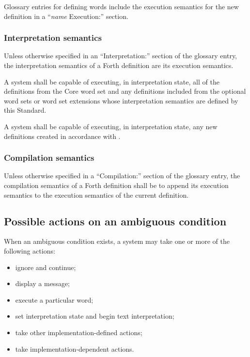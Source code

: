 Glossary entries for defining words include the execution semantics
for the new definition in a ``\emph{name} \textsf{Execution:}''
section.

\subsubsection{Interpretation semantics} %
\label{usage:interpret}

Unless otherwise specified in an ``\textsf{Interpretation:}''
section of the glossary entry, the interpretation semantics of a
Forth definition are its execution semantics.

A system shall be capable of executing, in interpretation state,
all of the definitions from the Core word set and any definitions
included from the optional word sets or word set extensions whose
interpretation semantics are defined by this Standard.

A system shall be capable of executing, in interpretation state,
any new definitions created in accordance with
.

\subsubsection{Compilation semantics} %
\label{usage:compile}

Unless otherwise specified in a ``\textsf{Compilation:}'' section
of the glossary entry, the compilation semantics of a Forth
definition shall be to append its execution semantics to the
execution semantics of the current definition.


\subsection{Possible actions on an ambiguous condition} %
\label{usage:ambiguous}

When an ambiguous condition exists, a system may take one or more
of the following actions:

\begin{itemize}
\item ignore and continue;
\item display a message;
\item execute a particular word;
\item set interpretation state and begin text interpretation;
\item take other implementation-defined actions;
\item take implementation-dependent actions.
\end{itemize}

